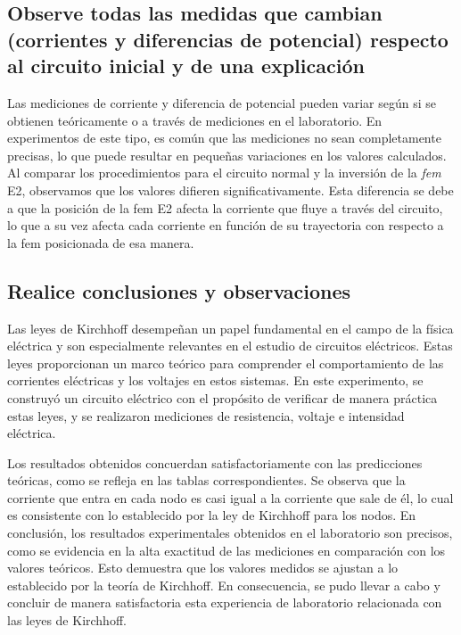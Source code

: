 \documentclass[twocolumn, 12pt]{article}
\begin{document}
\subsection{Observe todas las medidas que cambian (corrientes y diferencias de potencial) respecto
    al circuito inicial y de una explicación}

Las mediciones de corriente y diferencia de potencial
pueden variar según si se obtienen teóricamente o a través
de mediciones en el laboratorio. En experimentos de este
tipo, es común que las mediciones no sean completamente
precisas, lo que puede resultar en pequeñas variaciones en
los valores calculados. Al comparar los procedimientos para
el circuito normal y la inversión de la \textit{fem} E2,
observamos que los valores difieren significativamente.
Esta diferencia se debe a que la posición de la fem E2
afecta la corriente que fluye a través del circuito, lo que
a su vez afecta cada corriente en función de su trayectoria
con respecto a la fem posicionada de esa manera.

\subsection{Realice conclusiones y observaciones}

Las leyes de Kirchhoff desempeñan un papel fundamental en
el campo de la física eléctrica y son especialmente
relevantes en el estudio de circuitos eléctricos. Estas
leyes proporcionan un marco teórico para comprender el
comportamiento de las corrientes eléctricas y los voltajes
en estos sistemas. En este experimento, se construyó un
circuito eléctrico con el propósito de verificar de manera
práctica estas leyes, y se realizaron mediciones de
resistencia, voltaje e intensidad eléctrica.

Los resultados obtenidos concuerdan satisfactoriamente con
las predicciones teóricas, como se refleja en las tablas
correspondientes. Se observa que la corriente que entra en
cada nodo es casi igual a la corriente que sale de él, lo
cual es consistente con lo establecido por la ley de
Kirchhoff para los nodos. En conclusión, los resultados
experimentales obtenidos en el laboratorio son precisos,
como se evidencia en la alta exactitud de las mediciones en
comparación con los valores teóricos. Esto demuestra que
los valores medidos se ajustan a lo establecido por la
teoría de Kirchhoff. En consecuencia, se pudo llevar a cabo
y concluir de manera satisfactoria esta experiencia de
laboratorio relacionada con las leyes de Kirchhoff.
\end{document}
